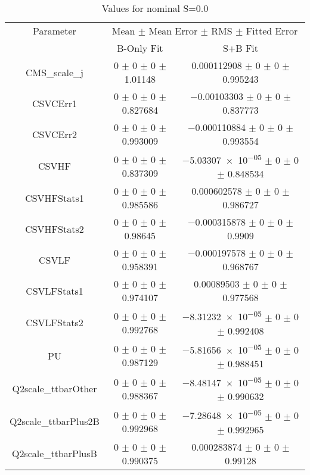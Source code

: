 \begin{table}
\centering
\caption{Values for nominal S=0.0}
\begin{tabular}{ccc}
\toprule
Parameter & \multicolumn{2}{c}{Mean $\pm$ Mean Error $\pm$ RMS $\pm$ Fitted Error}\\
 & B-Only Fit & S+B Fit\\
\midrule
CMS\_scale\_j & \num{0} $\pm$ \num{0} $\pm$ \num{0} $\pm$ \num{1.01148} & \num{0.000112908} $\pm$ \num{0} $\pm$ \num{0} $\pm$ \num{0.995243}\\
CSVCErr1 & \num{0} $\pm$ \num{0} $\pm$ \num{0} $\pm$ \num{0.827684} & \num{-0.00103303} $\pm$ \num{0} $\pm$ \num{0} $\pm$ \num{0.837773}\\
CSVCErr2 & \num{0} $\pm$ \num{0} $\pm$ \num{0} $\pm$ \num{0.993009} & \num{-0.000110884} $\pm$ \num{0} $\pm$ \num{0} $\pm$ \num{0.993554}\\
CSVHF & \num{0} $\pm$ \num{0} $\pm$ \num{0} $\pm$ \num{0.837309} & \num{-5.03307e-05} $\pm$ \num{0} $\pm$ \num{0} $\pm$ \num{0.848534}\\
CSVHFStats1 & \num{0} $\pm$ \num{0} $\pm$ \num{0} $\pm$ \num{0.985586} & \num{0.000602578} $\pm$ \num{0} $\pm$ \num{0} $\pm$ \num{0.986727}\\
CSVHFStats2 & \num{0} $\pm$ \num{0} $\pm$ \num{0} $\pm$ \num{0.98645} & \num{-0.000315878} $\pm$ \num{0} $\pm$ \num{0} $\pm$ \num{0.9909}\\
CSVLF & \num{0} $\pm$ \num{0} $\pm$ \num{0} $\pm$ \num{0.958391} & \num{-0.000197578} $\pm$ \num{0} $\pm$ \num{0} $\pm$ \num{0.968767}\\
CSVLFStats1 & \num{0} $\pm$ \num{0} $\pm$ \num{0} $\pm$ \num{0.974107} & \num{0.00089503} $\pm$ \num{0} $\pm$ \num{0} $\pm$ \num{0.977568}\\
CSVLFStats2 & \num{0} $\pm$ \num{0} $\pm$ \num{0} $\pm$ \num{0.992768} & \num{-8.31232e-05} $\pm$ \num{0} $\pm$ \num{0} $\pm$ \num{0.992408}\\
PU & \num{0} $\pm$ \num{0} $\pm$ \num{0} $\pm$ \num{0.987129} & \num{-5.81656e-05} $\pm$ \num{0} $\pm$ \num{0} $\pm$ \num{0.988451}\\
Q2scale\_ttbarOther & \num{0} $\pm$ \num{0} $\pm$ \num{0} $\pm$ \num{0.988367} & \num{-8.48147e-05} $\pm$ \num{0} $\pm$ \num{0} $\pm$ \num{0.990632}\\
Q2scale\_ttbarPlus2B & \num{0} $\pm$ \num{0} $\pm$ \num{0} $\pm$ \num{0.992968} & \num{-7.28648e-05} $\pm$ \num{0} $\pm$ \num{0} $\pm$ \num{0.992965}\\
Q2scale\_ttbarPlusB & \num{0} $\pm$ \num{0} $\pm$ \num{0} $\pm$ \num{0.990375} & \num{0.000283874} $\pm$ \num{0} $\pm$ \num{0} $\pm$ \num{0.99128}\\

\end{tabular}
\end{table}
